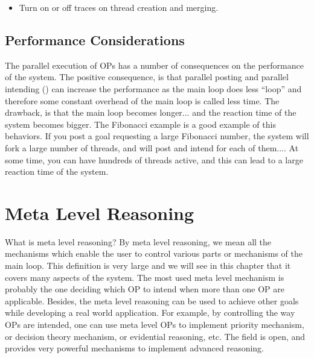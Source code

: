 \begin{itemize}

\item {} Turn on or off traces on thread creation and
merging.

\end{itemize}

\section{Performance Considerations}

The parallel execution of OPs has a number of consequences on the performance of
the system. The positive consequence, is that parallel posting and parallel
intending () can increase the performance as
the main loop does less ``loop'' and therefore some constant overhead of the
main loop is called less time. The drawback, is that the main loop becomes
longer... and the reaction time of the system becomes bigger. The Fibonacci
example is a good example of this behaviors. If you post a goal requesting
a large Fibonacci number, the system will fork a large number of threads, and
will post and intend for each of them.... At some time, you can have hundreds
of threads active, and this can lead to a large reaction time of the system.

\chapter{Meta Level Reasoning}

What is meta level reasoning? By meta level reasoning, we mean all the
mechanisms which enable the user to control various parts or mechanisms of the
\CPK{} main loop. This definition is very large and we will see in this chapter
that it covers many aspects of the \COPRS{} system. The most used meta level
mechanism is probably the one deciding which OP to intend when more than one OP
are applicable. Besides, the meta level reasoning can be used to achieve other
goals while developing a real world application. For example, by controlling
the way OPs are intended, one can use meta level OPs to implement priority
mechanism, or decision theory mechanism, or evidential reasoning, etc. The
field is open, and \COPRS{} provides very powerful mechanisms to implement
advanced reasoning.



